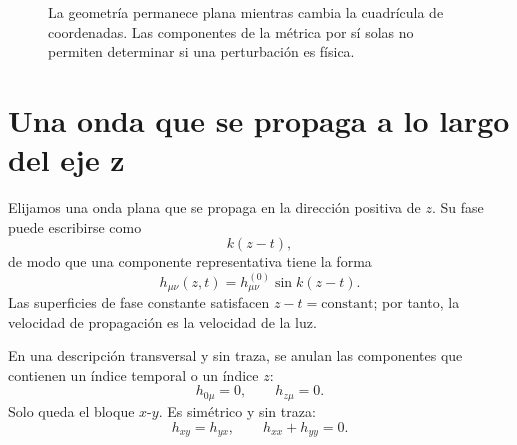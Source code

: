 \begin{figure}[htbp]
\centering
{}
\caption{La geometría permanece plana mientras cambia la cuadrícula de coordenadas. Las componentes de la métrica por sí solas no permiten determinar si una perturbación es física.}
\end{figure}

\section{Una onda que se propaga a lo largo del eje z}

Elijamos una onda plana que se propaga en la dirección positiva de \(z\). Su fase puede escribirse como
\begin{equation}
 k(z-t),
\end{equation}
de modo que una componente representativa tiene la forma
\begin{equation}
 h_{\mu\nu}(z,t)
 =h_{\mu\nu}^{(0)}\sin k(z-t).
 \label{eq:plane-wave}
\end{equation}
Las superficies de fase constante satisfacen \(z-t=\text{constant}\); por tanto, la velocidad de propagación es la velocidad de la luz.

En una descripción transversal y sin traza, se anulan las componentes que contienen un índice temporal o un índice \(z\):
\begin{equation}
 h_{0\mu}=0,
 \qquad
 h_{z\mu}=0.
 \label{eq:tt-transverse}
\end{equation}
Solo queda el bloque \(x\)-\(y\). Es simétrico y sin traza:
\begin{equation}
 h_{xy}=h_{yx},
 \qquad
 h_{xx}+h_{yy}=0.
 \label{eq:tt-trace}
\end{equation}

